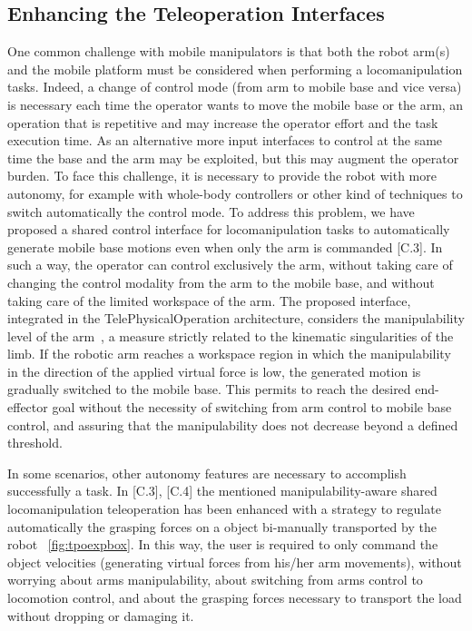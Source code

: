 \subsection{Enhancing the Teleoperation Interfaces}
One common challenge with mobile manipulators is that both the robot arm(s) and the mobile platform must be considered when performing a locomanipulation tasks. Indeed, a change of control mode (from arm to mobile base and vice versa) is necessary each time the operator wants to move the mobile base or the arm, an operation that is repetitive and may increase the operator effort and the task execution time. As an alternative more input interfaces to control at the same time the base and the arm may be exploited, but this may augment the operator burden. To face this challenge, it is necessary to provide the robot with more autonomy, for example with whole-body controllers or other kind of techniques to switch automatically the control mode.
To address this problem, we have proposed a shared control interface for locomanipulation tasks to automatically generate mobile base motions even when only the arm is commanded [C.3]. In such a way, the operator can control exclusively the arm, without taking care of changing the control modality from the arm to the mobile base, and without taking care of the limited workspace of the arm. The proposed interface, integrated in the TelePhysicalOperation architecture, considers the manipulability level of the arm~\cite{Yoshi1985}, a measure strictly related to the kinematic singularities of the limb. If the robotic arm reaches a workspace region in which the manipulability in the direction of the applied virtual force is low, the generated motion is gradually switched to the mobile base. This permits to reach the desired end-effector goal without the necessity of switching from arm control to mobile base control, and assuring that the manipulability does not decrease beyond a defined threshold. 

In some scenarios, other autonomy features are necessary to accomplish successfully a task. In [C.3], [C.4] the mentioned manipulability-aware shared locomanipulation teleoperation has been enhanced with a strategy to regulate automatically the grasping forces on a object bi-manually transported by the robot \figurename~\ref{fig:tpoexpbox}.
In this way, the user is required to only command the object velocities (generating virtual forces from his/her arm movements), without worrying about arms manipulability, about switching from arms control to locomotion control, and about the grasping forces necessary to transport the load without dropping or damaging it.

